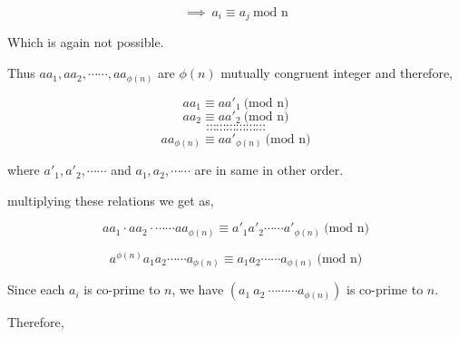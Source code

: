\documentclass[a4paper,12pt]{article}
\begin{document}
$$\implies\ a_i\equiv a_j\ \mbox{mod n}$$

Which is again not possible.


\vspace*{0.3cm}

Thus $aa_1,aa_2,\cdots \cdots ,aa_{\phi(n)}$ are $\phi(n)$ mutually congruent integer and therefore,

$$aa_1 \equiv aa'_1\ \mbox{(mod n)}$$
$$aa_2 \equiv aa'_2\ \mbox{(mod n)}$$
$$\cdots \cdots \cdots \cdots \cdots \cdots$$
$$\cdots \cdots \cdots \cdots \cdots \cdots$$
$$aa_{\phi(n)} \equiv aa'_{\phi(n)}\ \mbox{(mod n)}$$

where $a'_1,a'_2,\cdots \cdots$ and $a_1,a_2,\cdots \cdots$ are in same in other order.


\vspace*{0.3cm}

multiplying these relations we get as,

$$aa_1\cdot aa_2\cdot \cdots \cdots aa_{\phi(n)}\equiv a'_1a'_2\cdots \cdots a'_{\phi(n)}\ \mbox{(mod n)}$$

$$a^{\phi(n)}a_1a_2\cdots \cdots a_{\phi(n)}\equiv a_1a_2\cdots \cdots a_{\phi(n)}\ \mbox{(mod n)}$$

Since each $a_i$ is co-prime to $n$, we have $(a_1\  a_2\ \cdots \cdots \cdots a_{\phi(n)})$ is co-prime to $n$.

Therefore,


\vspace*{0.3cm}
\begin{center}
\end{center}
\end{document}
